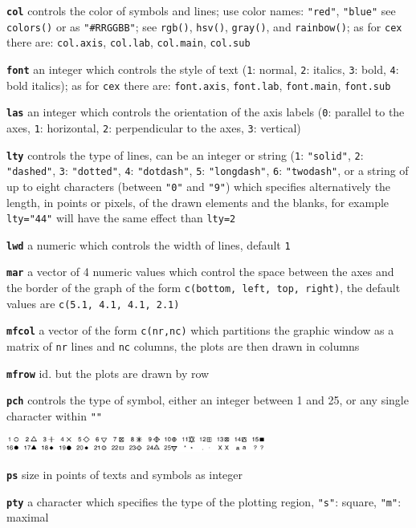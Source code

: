 \documentclass[10pt,landscape]{article}
\newcommand{\code}{\texttt}
\newcommand{\bcode}[1]{\texttt{\textbf{#1}}}
\begin{document}
\begin{multicols*}{3}
\bcode{col}  controls the color of symbols and lines; use color names:
\code{"red"}, \code{"blue"} see \code{colors()} or as \code{"\#RRGGBB"};
see \code{rgb()}, \code{hsv()}, \code{gray()}, and \code{rainbow()}; as for \code{cex} there are: \code{col.axis}, \code{col.lab}, \code{col.main}, \code{col.sub}

\bcode{font}  an integer which controls the style of text (\code{1}: normal, \code{2}: italics, \code{3}: bold, \code{4}: bold italics); as for \code{cex} there are: \code{font.axis}, \code{font.lab}, \code{font.main}, \code{font.sub}

\bcode{las}  an integer which controls the orientation of the axis labels (\code{0}: parallel to the axes, \code{1}: horizontal, \code{2}: perpendicular to the axes, \code{3}: vertical)

\bcode{lty}  controls the type of lines, can be an integer or string (\code{1}: \code{"solid"}, \code{2}: \code{"dashed"}, \code{3}: \code{"dotted"}, \code{4}: \code{"dotdash"}, \code{5}: \code{"longdash"}, \code{6}: \code{"twodash"}, or a string of up to eight characters (between \code{"0"} and \code{"9"}) which specifies alternatively the length, in points or pixels, of the drawn elements and the blanks, for example \code{lty="44"} will have the same effect than \code{lty=2}

\bcode{lwd}  a numeric which controls the width of lines, default \code{1}

\bcode{mar}  a vector of 4 numeric values which control the space between the axes and the border of the graph of the form \code{c(bottom, left, top, right)}, the default values are \code{c(5.1, 4.1, 4.1, 2.1)}

\bcode{mfcol}  a vector of the form \code{c(nr,nc)} which partitions the graphic window as a matrix of \code{nr} lines and \code{nc} columns, the plots are then drawn in columns

\bcode{mfrow}  id. but the plots are drawn by row

\bcode{pch}  controls the type of symbol, either an integer between 1
and 25, or any single character within \code{""}

\samepage\includegraphics[width=8.5cm]{pch_symbol} 

\bcode{ps}   size in points of texts and symbols as integer

\bcode{pty}  a character which specifies the type of the plotting region, \code{"s"}: square, \code{"m"}: maximal


\end{multicols*}
\end{document}
